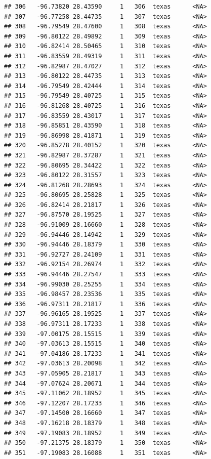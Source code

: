 \documentclass[
]{article}
\begin{document}
\begin{verbatim}
## 306   -96.73820 28.43590     1   306  texas      <NA>
## 307   -96.77258 28.44735     1   307  texas      <NA>
## 308   -96.79549 28.47600     1   308  texas      <NA>
## 309   -96.80122 28.49892     1   309  texas      <NA>
## 310   -96.82414 28.50465     1   310  texas      <NA>
## 311   -96.83559 28.49319     1   311  texas      <NA>
## 312   -96.82987 28.47027     1   312  texas      <NA>
## 313   -96.80122 28.44735     1   313  texas      <NA>
## 314   -96.79549 28.42444     1   314  texas      <NA>
## 315   -96.79549 28.40725     1   315  texas      <NA>
## 316   -96.81268 28.40725     1   316  texas      <NA>
## 317   -96.83559 28.43017     1   317  texas      <NA>
## 318   -96.85851 28.43590     1   318  texas      <NA>
## 319   -96.86998 28.41871     1   319  texas      <NA>
## 320   -96.85278 28.40152     1   320  texas      <NA>
## 321   -96.82987 28.37287     1   321  texas      <NA>
## 322   -96.80695 28.34422     1   322  texas      <NA>
## 323   -96.80122 28.31557     1   323  texas      <NA>
## 324   -96.81268 28.28693     1   324  texas      <NA>
## 325   -96.80695 28.25828     1   325  texas      <NA>
## 326   -96.82414 28.21817     1   326  texas      <NA>
## 327   -96.87570 28.19525     1   327  texas      <NA>
## 328   -96.91009 28.16660     1   328  texas      <NA>
## 329   -96.94446 28.14942     1   329  texas      <NA>
## 330   -96.94446 28.18379     1   330  texas      <NA>
## 331   -96.92727 28.24109     1   331  texas      <NA>
## 332   -96.92154 28.26974     1   332  texas      <NA>
## 333   -96.94446 28.27547     1   333  texas      <NA>
## 334   -96.99030 28.25255     1   334  texas      <NA>
## 335   -96.98457 28.23536     1   335  texas      <NA>
## 336   -96.97311 28.21817     1   336  texas      <NA>
## 337   -96.96165 28.19525     1   337  texas      <NA>
## 338   -96.97311 28.17233     1   338  texas      <NA>
## 339   -97.00175 28.15515     1   339  texas      <NA>
## 340   -97.03613 28.15515     1   340  texas      <NA>
## 341   -97.04186 28.17233     1   341  texas      <NA>
## 342   -97.03613 28.20098     1   342  texas      <NA>
## 343   -97.05905 28.21817     1   343  texas      <NA>
## 344   -97.07624 28.20671     1   344  texas      <NA>
## 345   -97.11062 28.18952     1   345  texas      <NA>
## 346   -97.12207 28.17233     1   346  texas      <NA>
## 347   -97.14500 28.16660     1   347  texas      <NA>
## 348   -97.16218 28.18379     1   348  texas      <NA>
## 349   -97.19083 28.18952     1   349  texas      <NA>
## 350   -97.21375 28.18379     1   350  texas      <NA>
## 351   -97.19083 28.16088     1   351  texas      <NA>

\end{verbatim}
\end{document}
